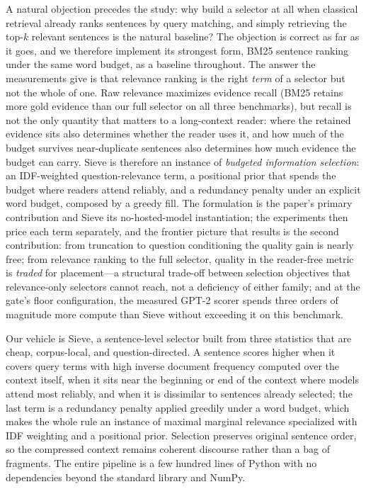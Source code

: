 \documentclass[preprint,12pt]{elsarticle}
\theoremstyle{remark}
\newcommand{\method}{Sieve}
\begin{document}
A natural objection precedes the study: why build a selector at all
when classical retrieval already ranks sentences by query matching,
and simply retrieving the top-$k$ relevant sentences is the natural
baseline? The objection
is correct as far as it goes, and we therefore implement its strongest
form, BM25 sentence ranking under the same word budget, as a baseline
throughout. The answer the measurements give is that relevance ranking
is the right \emph{term} of a selector but not the whole of one.
Raw relevance maximizes evidence recall (BM25 retains more gold
evidence than our full selector on all three benchmarks), but recall
is not the only quantity that matters to a long-context reader: where
the retained evidence sits also determines whether the reader uses it,
and how much of the budget survives near-duplicate sentences also
determines how much evidence the budget can carry. \method{} is
therefore an instance of \emph{budgeted information selection}: an
IDF-weighted question-relevance term, a positional prior that spends
the budget where readers attend reliably, and a redundancy penalty
under an explicit word budget, composed by a greedy fill. The
formulation is the paper's primary contribution and \method{} its
no-hosted-model instantiation; the experiments then price each term
separately, and the frontier picture that results is the second
contribution: from truncation to question conditioning the quality gain
is nearly free; from relevance ranking to the full selector, quality in
the reader-free metric is \emph{traded} for placement---a structural
trade-off between selection objectives that relevance-only selectors
cannot reach, not a deficiency of either family; and at the gate's
floor configuration, the measured GPT-2 scorer spends three orders of
magnitude more compute than \method{} without exceeding it on this
benchmark.

Our vehicle is \method{}, a sentence-level selector built from three
statistics that are cheap, corpus-local, and question-directed. A
sentence scores higher when it covers query terms with high inverse
document frequency computed over the context itself, when it sits near
the beginning or end of the context where models attend most reliably,
and when it is dissimilar to sentences already selected; the last term
is a redundancy penalty applied greedily under a word budget, which
makes the whole rule an instance of maximal marginal relevance
\citep{carbonell1998mmr} specialized with IDF weighting
\citep{robertson2009bm25} and a positional prior. Selection preserves
original sentence order, so the compressed context remains coherent
discourse rather than a bag of fragments. The entire pipeline is a few
hundred lines of Python with no dependencies beyond the standard
library and NumPy.
\end{document}
